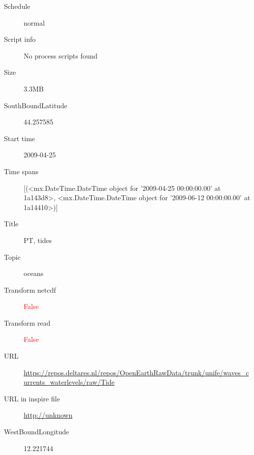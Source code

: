 \documentclass[9]{report}
\begin{document}
\begin{description}
\begin{verbatim}
\end{verbatim}
  \item[Schedule] normal
  \item[Script info] No process scripts found
  \item[Size] 3.3MB
  \item[SouthBoundLatitude] 44.257585
  \item[Start time] 2009-04-25
  \item[Time spans] [(<mx.DateTime.DateTime object for '2009-04-25 00:00:00.00' at 1a143d8>, <mx.DateTime.DateTime object for '2009-06-12 00:00:00.00' at 1a14410>)]
  \item[Title]  PT, tides 
  \item[Topic] oceans
  \item[Transform netcdf] \textcolor{red}{False}
  \item[Transform read] \textcolor{red}{False}
  \item[URL] \href{https://repos.deltares.nl/repos/OpenEarthRawData/trunk/unife/waves\_currents\_waterlevels/raw/Tide}{https://repos.deltares.nl/repos/OpenEarthRawData/trunk/unife/waves\_currents\_waterlevels/raw/Tide}
  \item[URL in inspire file] \href{http://unknown}{http://unknown}
  \item[WestBoundLongitude] 12.221744
\end{description}
\end{document}
